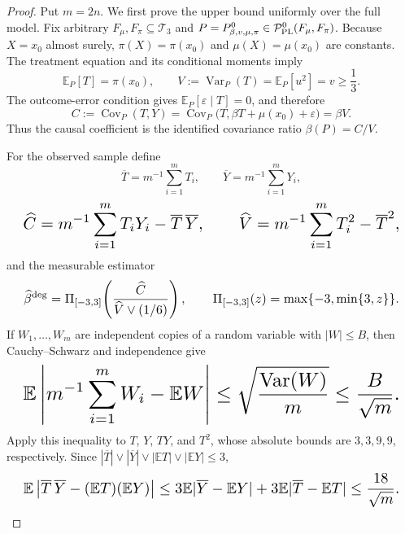 \documentclass{article}
\begin{document}
\begin{proof}
Put \(m=2n\). We first prove the upper bound uniformly over the full model. Fix arbitrary \(F_\mu,F_\pi\subseteq\mathcal T_3\) and \(P=P^0_{\beta,v,\mu,\pi}\in\mathcal P_{\rm PL}^{0}(F_\mu,F_\pi)\). Because \(X=x_0\) almost surely, \(\pi(X)=\pi(x_0)\) and \(\mu(X)=\mu(x_0)\) are constants. The treatment equation and its conditional moments imply
\[
\mathbb E_P[T]=\pi(x_0),\qquad V:=\operatorname{Var}_P(T)=\mathbb E_P[u^2]=v\ge\frac13.
\]
The outcome-error condition gives \(\mathbb E_P[\varepsilon\mid T]=0\), and therefore
\[
C:=\operatorname{Cov}_P(T,Y)=\operatorname{Cov}_P\bigl(T,\beta T+\mu(x_0)+\varepsilon\bigr)=\beta V.
\]
Thus the causal coefficient is the identified covariance ratio \(\beta(P)=C/V\).

For the observed sample define
\[
\overline T=m^{-1}\sum_{i=1}^mT_i,\qquad \overline Y=m^{-1}\sum_{i=1}^mY_i,
\]
\[
\makebox[\linewidth][c]{\resizebox{0.98\linewidth}{!}{\par\noindent \makebox[\linewidth][c]{\resizebox{0.98\linewidth}{!}{\(\displaystyle \displaystyle \widehat C=m^{-1}\sum_{i=1}^mT_iY_i-\overline T\,\overline Y,\qquad \widehat V=m^{-1}\sum_{i=1}^mT_i^2-\overline T^2,\)}}\par\noindent}}
\]
and the measurable estimator
\[
\makebox[\linewidth][c]{\resizebox{0.98\linewidth}{!}{\par\noindent \makebox[\linewidth][c]{\resizebox{0.98\linewidth}{!}{\(\displaystyle \displaystyle \widehat\beta^{\rm deg}=\Pi_{[-3,3]}\!\left(\frac{\widehat C}{\widehat V\vee(1/6)}\right),\qquad \Pi_{[-3,3]}(z)=\max\{-3,\min\{3,z\}\}.\)}}\par\noindent}}
\]
If \(W_1,\ldots,W_m\) are independent copies of a random variable with \(|W|\le B\), then Cauchy--Schwarz and independence give
\[
\makebox[\linewidth][c]{\resizebox{0.98\linewidth}{!}{\par\noindent \makebox[\linewidth][c]{\resizebox{0.98\linewidth}{!}{\(\displaystyle \displaystyle \mathbb E\left|m^{-1}\sum_{i=1}^mW_i-\mathbb EW\right|\le\sqrt{\frac{\operatorname{Var}(W)}m}\le\frac{B}{\sqrt m}.\)}}\par\noindent}}
\]
Apply this inequality to \(T\), \(Y\), \(TY\), and \(T^2\), whose absolute bounds are \(3,3,9,9\), respectively. Since \(|\overline T|\vee|\overline Y|\vee|\mathbb ET|\vee|\mathbb EY|\le3\),
\[
\makebox[\linewidth][c]{\resizebox{0.98\linewidth}{!}{\par\noindent \makebox[\linewidth][c]{\resizebox{0.98\linewidth}{!}{\(\displaystyle \displaystyle \mathbb E\left|\overline T\,\overline Y-(\mathbb ET)(\mathbb EY)\right|\le3\mathbb E|\overline Y-\mathbb EY|+3\mathbb E|\overline T-\mathbb ET|\le\frac{18}{\sqrt m}.\)}}\par\noindent}}
\]
\end{proof}
\end{document}
